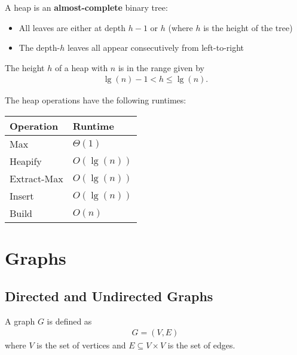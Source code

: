 \documentclass{article}
\begin{document}
\begin{definition}
	A heap is an \textbf{almost-complete} binary tree:
	\begin{itemize}
		\item All leaves are either at depth $h-1$ or $h$ (where $h$ is the height of the tree)
		\item The depth-$h$ leaves all appear consecutively from left-to-right
	\end{itemize}
\end{definition}
\begin{lemma}
	The height $h$ of a heap with $n$ is in the range given by
	\begin{align*}
		\lg(n)-1 < h \leq \lg(n).
	\end{align*}
\end{lemma}
\begin{theorem}
	The heap operations have the following runtimes:
	\\
	\begin{center}
	\begin{tabular}{| l | l |}
		\hline
		Operation & Runtime\\
		\hline
		Max & $\Theta(1)$\\
		\hline
		Heapify & $O(\lg(n))$\\
		\hline
		Extract-Max & $O(\lg(n))$\\
		\hline
		Insert & $O(\lg(n))$\\
		\hline
		Build & $O(n)$\\
		\hline
	\end{tabular}
	\end{center}
\end{theorem}


\section{Graphs}


\subsection{Directed and Undirected Graphs}

\begin{definition}
	A graph $G$ is defined as
	\begin{align*}
		G = (V,E)
	\end{align*}
	where $V$ is the set of vertices and $E\subseteq V\times V$ is the set of edges.
\end{definition}
\end{document}
